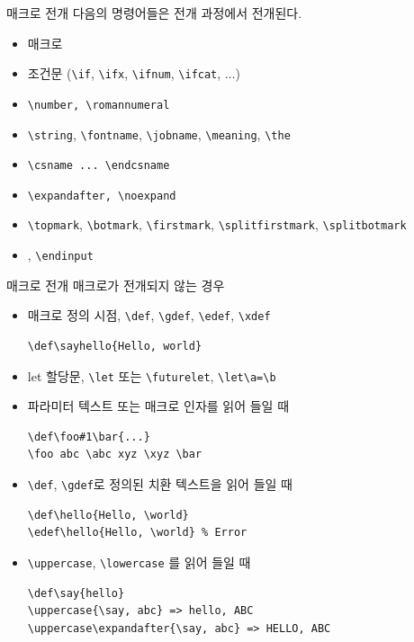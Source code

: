 \documentclass{beamer}
\begin{document}
%
\begin{frame}[fragile]{매크로 전개}
  다음의 명령어들은 전개 과정에서 전개된다.
  \begin{itemize}
  \item \alert{매크로}
  \item 조건문 (\verb+\if+, \verb+\ifx+, \verb+\ifnum+, \verb+\ifcat+, $\ldots$)
  \item \verb+\number, \romannumeral+
  \item \verb+\string+, \verb+\fontname+, \verb+\jobname+,
    \verb+\meaning+, \verb+\the+
  \item \verb+\csname ... \endcsname+
  \item \verb+\expandafter, \noexpand+
  \item \verb+\topmark+, \verb+\botmark+, \verb+\firstmark+,
    \verb+\splitfirstmark+, \verb+\splitbotmark+
  \item \verb++,  \verb+\endinput+
  \end{itemize}
\end{frame}


%
\begin{frame}[fragile]{매크로 전개}
  매크로가 전개되지 않는 경우
  \begin{itemize}
  \item 매크로 정의 시점, \verb+\def+, \verb+\gdef+, \verb+\edef+, \verb+\xdef+
\begin{Verbatim}[fontsize=\small, formatcom=\color{blue}]
\def\sayhello{Hello, world}
\end{Verbatim}
  \item let 할당문, \verb+\let+ 또는 \verb+\futurelet+,
  {\color{blue} \verb+\let\a=\b+}
  \item 파라미터 텍스트 또는 매크로 인자를 읽어 들일 때
\begin{Verbatim}[fontsize=\small, formatcom=\color{blue}]
\def\foo#1\bar{...}
\foo abc \abc xyz \xyz \bar
\end{Verbatim}
  \item \verb+\def+, \verb+\gdef+로 정의된 치환 텍스트을 읽어 들일 때
\begin{Verbatim}[fontsize=\small, formatcom=\color{blue}] 
\def\hello{Hello, \world}
\edef\hello{Hello, \world} % Error
\end{Verbatim}
  \item \verb+\uppercase+, \verb+\lowercase+ 를 읽어 들일 때
\begin{Verbatim}[fontsize=\small, formatcom=\color{blue}]
\def\say{hello}
\uppercase{\say, abc} => hello, ABC
\uppercase\expandafter{\say, abc} => HELLO, ABC  
\end{Verbatim}
  \end{itemize}
\end{frame}
\end{document}
